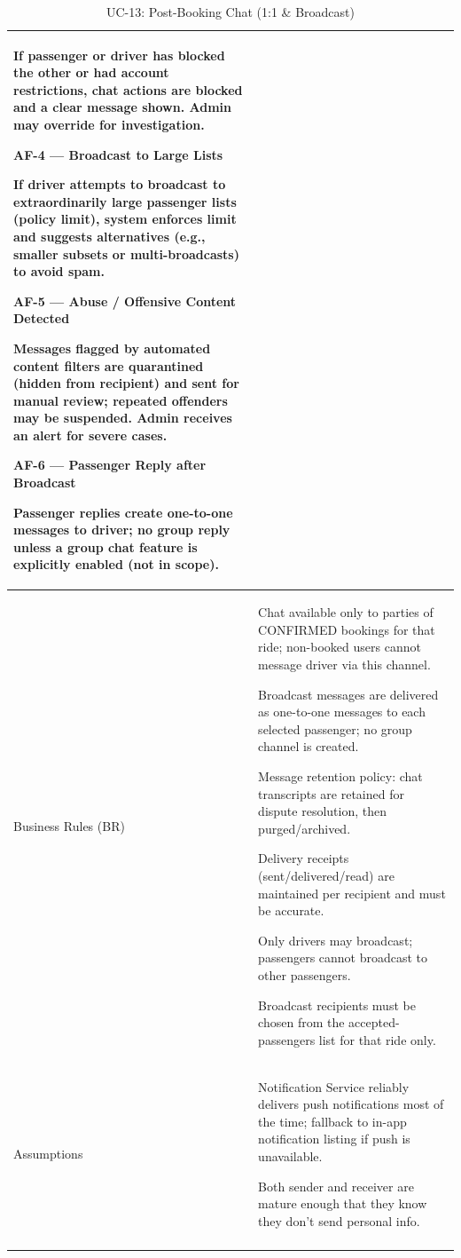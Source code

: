 \begin{longtable}{|p{3.5cm}|p{12cm}|}
If passenger or driver has blocked the other or had account restrictions, chat actions are blocked and a clear message shown. Admin may override for investigation.

\textbf{AF-4 --- Broadcast to Large Lists}

If driver attempts to broadcast to extraordinarily large passenger lists (policy limit), system enforces limit and suggests alternatives (e.g., smaller subsets or multi-broadcasts) to avoid spam.

\textbf{AF-5 --- Abuse / Offensive Content Detected}

Messages flagged by automated content filters are quarantined (hidden from recipient) and sent for manual review; repeated offenders may be suspended. Admin receives an alert for severe cases.

\textbf{AF-6 --- Passenger Reply after Broadcast}

Passenger replies create one-to-one messages to driver; no group reply unless a group chat feature is explicitly enabled (not in scope). \\
\hline
Business Rules (BR) &
Chat available only to parties of CONFIRMED bookings for that ride; non-booked users cannot message driver via this channel.

Broadcast messages are delivered as one-to-one messages to each selected passenger; no group channel is created.

Message retention policy: chat transcripts are retained for dispute resolution, then purged/archived.

Delivery receipts (sent/delivered/read) are maintained per recipient and must be accurate.

Only drivers may broadcast; passengers cannot broadcast to other passengers.

Broadcast recipients must be chosen from the accepted-passengers list for that ride only. \\
\hline
Assumptions &
Notification Service reliably delivers push notifications most of the time; fallback to in-app notification listing if push is unavailable.

Both sender and receiver are mature enough that they know they don’t send personal info. \\
\hline
\caption{UC-13: Post-Booking Chat (1:1 \& Broadcast)}
\end{longtable}

